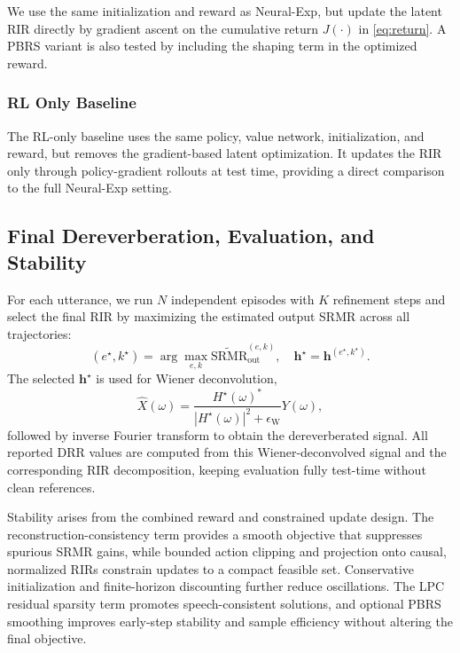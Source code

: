 \documentclass[10pt,conference]{IEEEtran}
\begin{document}
We use the same initialization and reward as Neural-Exp, but update the latent RIR directly by gradient ascent on the cumulative return \(J(\cdot)\) in \eqref{eq:return}. A PBRS variant is also tested by including the shaping term in the optimized reward.

\subsubsection{RL Only Baseline}

The RL-only baseline uses the same policy, value network, initialization, and reward, but removes the gradient-based latent optimization. It updates the RIR only through policy-gradient rollouts at test time, providing a direct comparison to the full Neural-Exp setting.

\subsection{Final Dereverberation, Evaluation, and Stability}

For each utterance, we run \(N\) independent episodes with \(K\) refinement steps and select the final RIR by maximizing the estimated output SRMR across all trajectories:
\begin{equation}
\label{eq:final_selection}
(e^\star,k^\star)=\arg\max_{e,k}\widetilde{\mathrm{SRMR}}_{\mathrm{out}}^{(e,k)}, \quad
\mathbf{h}^\star=\mathbf{h}^{(e^\star,k^\star)}.
\end{equation}
The selected \(\mathbf{h}^\star\) is used for Wiener deconvolution,
\begin{equation}
\label{eq:wiener_final}
\hat{X}(\omega)=\frac{H^\star(\omega)^*}{|H^\star(\omega)|^2+\epsilon_{\text{W}}}Y(\omega),
\end{equation}
followed by inverse Fourier transform to obtain the dereverberated signal. All reported DRR values are computed from this Wiener-deconvolved signal and the corresponding RIR decomposition, keeping evaluation fully test-time without clean references.

Stability arises from the combined reward and constrained update design. The reconstruction-consistency term provides a smooth objective that suppresses spurious SRMR gains, while bounded action clipping and projection onto causal, normalized RIRs constrain updates to a compact feasible set. Conservative initialization and finite-horizon discounting further reduce oscillations. The LPC residual sparsity term promotes speech-consistent solutions, and optional PBRS smoothing improves early-step stability and sample efficiency without altering the final objective.
\end{document}
